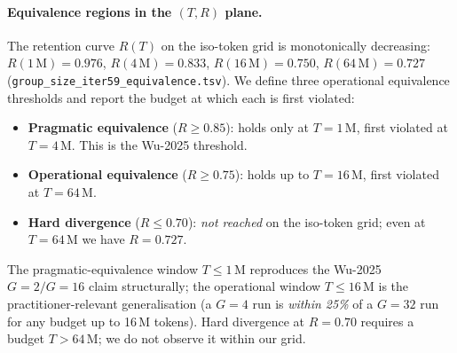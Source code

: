 \paragraph{Equivalence regions in the $(T, R)$ plane.}
The retention curve
$R(T)$ on the iso-token grid is monotonically decreasing:
$R(1\,\mathrm{M}) = 0.976$, $R(4\,\mathrm{M}) = 0.833$,
$R(16\,\mathrm{M}) = 0.750$, $R(64\,\mathrm{M}) = 0.727$
(\texttt{group\_size\_iter59\_equivalence.tsv}).  We define three
operational equivalence thresholds and report the budget at which each
is first violated:
\begin{itemize}
  \item \textbf{Pragmatic equivalence} ($R \geq 0.85$): holds only at
        $T = 1$\,M, first violated at $T = 4$\,M.  This is the
        Wu-2025 threshold.
  \item \textbf{Operational equivalence} ($R \geq 0.75$): holds up to
        $T = 16$\,M, first violated at $T = 64$\,M.
  \item \textbf{Hard divergence} ($R \leq 0.70$): \emph{not reached}
        on the iso-token grid; even at $T = 64$\,M we have
        $R = 0.727$.
\end{itemize}
The pragmatic-equivalence window $T \leq 1$\,M reproduces the Wu-2025
$G{=}2/G{=}16$ claim structurally; the operational window
$T \leq 16$\,M is the practitioner-relevant generalisation (a $G{=}4$
run is \emph{within 25\%} of a $G{=}32$ run for any budget up to
16\,M tokens).  Hard divergence at $R = 0.70$ requires a budget
$T > 64$\,M; we do not observe it within our grid.

